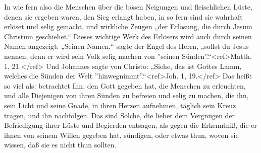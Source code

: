 In wie fern also die Menschen über die bösen Neigungen und fleischlichen Lüste, denen sie ergeben waren, den Sieg erlangt haben, in so fern sind sie wahrhaft erlöset und selig gemacht, und wirkliche Zeugen „der Erlösung, die durch Jesum Christum geschiehet.“ Dieses wichtige Werk des Erlösers wird auch durch seinen Namen angezeigt: „Seinen Namen,“ sagte der Engel des Herrn, „sollst du Jesus nennen; denn er wird sein Volk selig machen von ''seinen Sünden''.“<ref>Matth. 1, 21.</ref> Und Johannes sagte von Christo: „Siehe, das ist Gottes Lamm, welches die Sünden der Welt ''hinwegnimmt''.“<ref>Joh. 1, 19.</ref> Das heißt so viel als: betrachtet Ihn, den Gott gegeben hat, die Menschen zu erleuchten, und alle Diejenigen von ihren Sünden zu befreien und selig zu machen, die ihn, sein Licht und seine Gnade, in ihren Herzen aufnehmen, täglich sein Kreuz tragen, und ihn nachfolgen. Das sind Solche, die lieber dem Vergnügen der Befriedigung ihrer Lüste und Begierden entsagen, als gegen die Erkenntniß, die er ihnen von seinem Willen gegeben hat, sündigen, oder etwas thun, wovon sie wissen, daß sie es nicht thun sollten. 





